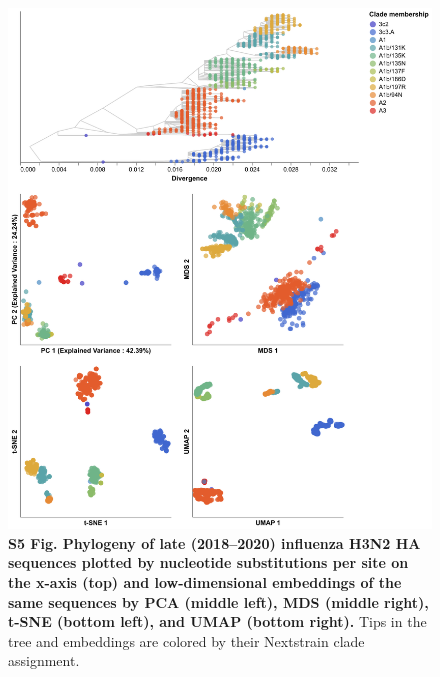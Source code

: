 \documentclass[10pt,letterpaper]{article}
\begin{document}
\begin{figure}[!h]
\includegraphics[width=\columnwidth]{figures/flu-2018-2020-ha-embeddings-by-clade.png}
\caption*{{\bf S5 Fig. Phylogeny of late (2018--2020) influenza H3N2 HA sequences plotted by nucleotide substitutions per site on the x-axis (top) and low-dimensional embeddings of the same sequences by PCA (middle left), MDS (middle right), t-SNE (bottom left), and UMAP (bottom right).}
  Tips in the tree and embeddings are colored by their Nextstrain clade assignment.}
\end{figure}
\end{document}
